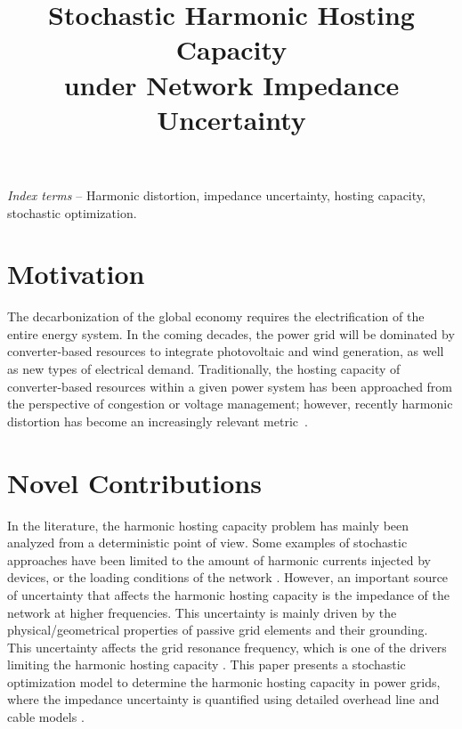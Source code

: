 \documentclass{IEEEtran4PSCC}
\begin{document}
\onecolumn

\title{Stochastic Harmonic Hosting Capacity  \\ under Network Impedance Uncertainty}

\author{
}

\maketitle

{\it Index terms} -- Harmonic distortion, impedance uncertainty, hosting capacity, stochastic optimization.

\section{Motivation}
The decarbonization of the global economy requires the electrification of the entire energy system. In the coming decades, the power grid will be dominated by converter-based resources to integrate photovoltaic and wind generation, as well as new types of electrical demand. Traditionally, the hosting capacity of converter-based resources within a given power system has been approached from the perspective of congestion or voltage management; however, recently harmonic distortion has become an increasingly relevant metric~\cite{sun_distribution_2022}.

\section{Novel Contributions}
In the literature, the harmonic hosting capacity problem has mainly been analyzed from a deterministic point of view. Some examples of stochastic approaches have been limited to the amount of harmonic currents injected by devices, or the loading conditions of the network \cite{bozicek_harmonic_2018}. However, an important source of uncertainty that affects the harmonic hosting capacity is the impedance of the network at higher frequencies. This uncertainty is mainly driven by the physical/geometrical properties of passive grid elements and their grounding. This uncertainty affects the grid resonance frequency, which is one of the drivers limiting the harmonic hosting capacity \cite{tom_van_acker_impact_2025}. This paper presents a stochastic optimization model to determine the harmonic hosting capacity in power grids, where the impedance uncertainty is quantified using detailed overhead line and cable models \cite{martins-britto_multilayer_2020}. 
\end{document}
